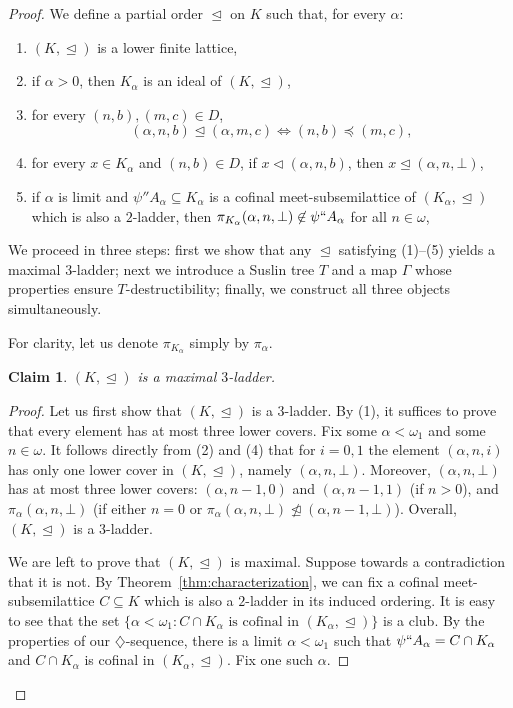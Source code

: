 \documentclass[]{amsart}
\newtheorem{claim}{Claim}[theorem]
\theoremstyle{definition}
\theoremstyle{remark}
\begin{document}
\begin{proof}
We define a partial order $\trianglelefteq$ on $K$ such that, for every $\alpha$:
\begin{enumerate}
\item $(K, \trianglelefteq)$ is a lower finite lattice,
\item if $\alpha > 0$, then $K_\alpha$ is an ideal of $(K, \trianglelefteq)$,
\item for every $(n, b), (m ,c) \in D$, 
\[
(\alpha, n, b) \trianglelefteq (\alpha, m, c) \iff (n, b) \preceq (m, c),
\]
\item for every $x \in K_\alpha$ and $(n, b) \in D$, if $x \lhd (\alpha, n, b)$, then $x \trianglelefteq (\alpha, n, \bot)$,
\item if $\alpha$ is limit and  $\psi'' A_\alpha \subseteq K_\alpha$ is a cofinal meet-subsemilattice of $(K_\alpha, \trianglelefteq)$ which is also a $2$-ladder, then $\pi_{K_\alpha}(\alpha, n, \bot) \not\in \psi`` A_\alpha$ for all $n\in\omega$,
\end{enumerate}


We proceed in three steps: first we show that any $\trianglelefteq$ satisfying (1)–(5) yields a maximal $3$-ladder; next we introduce a Suslin tree $T$ and a map $\Gamma$ whose properties ensure $T$-destructibility; finally, we construct all three objects simultaneously.

For clarity, let us denote $\pi_{K_\alpha}$ simply by $\pi_\alpha$.

\begin{claim}
$(K, \trianglelefteq)$ is a maximal $3$-ladder.
\end{claim}
\begin{proof}
Let us first show that $(K, \trianglelefteq)$ is a $3$-ladder. By (1), it suffices to prove that every element has at most three lower covers. Fix some $\alpha < \omega_1$ and some $n \in\omega$. It follows directly from (2) and (4) that for $i= 0, 1$ the element $(\alpha, n, i)$ has only one lower cover in $(K, \trianglelefteq)$, namely  $(\alpha, n, \bot)$. Moreover, $(\alpha, n, \bot)$ has at most three lower covers: $(\alpha, n-1, 0)$ and $(\alpha, n-1, 1)$ (if $n > 0$), and $\pi_\alpha(\alpha, n, \bot)$ (if either $n = 0$ or $\pi_\alpha(\alpha, n, \bot) \ntrianglelefteq (\alpha, n-1, \bot)$). Overall, $(K, \trianglelefteq)$ is a $3$-ladder.

We are left to prove that $(K, \trianglelefteq)$ is maximal. Suppose towards a contradiction that it is not. By Theorem~\ref{thm:characterization}, we can fix a cofinal meet-subsemilattice $C\subseteq K$ which is also a $2$-ladder in its induced ordering. It is easy to see that the set $\{\alpha < \omega_1: C \cap K_\alpha \text{ is cofinal in } (K_\alpha, \trianglelefteq)\}$ is a club. By the properties of our $\diamondsuit$-sequence, there is a limit $\alpha < \omega_1$ such that $\psi`` A_\alpha = C \cap K_\alpha$ and $C \cap K_\alpha$ is cofinal in $(K_\alpha, \trianglelefteq)$. Fix one such $\alpha$. 


\end{proof}
\end{proof}
\end{document}
